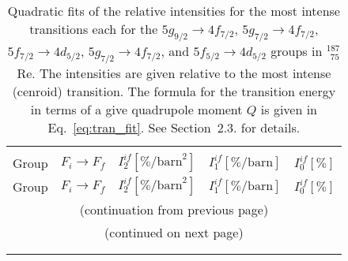 %
\begin{longtable}{cc|rrr}
\caption{\label{tab:re187intens}%
Quadratic fits of the relative intensities for the most intense transitions each for the $5g_{9/2}\rightarrow4f_{7/2}$, $5g_{7/2}\rightarrow4f_{7/2}$, $5f_{7/2}\rightarrow4d_{5/2}$, $5g_{7/2}\rightarrow4f_{7/2}$, and $5f_{5/2}\rightarrow4d_{5/2}$ groups in $^{187}_{\;\,75}$Re. The intensities are given relative to the most intense (cenroid) transition. The formula for the transition energy in terms of a give quadrupole moment $Q$ is given in Eq.~\eqref{eq:tran_fit}. See Section~2.3. for details.}
\\\hline\\[-10pt]\hline\\[-10pt]
\centering
Group& $F_i \rightarrow F_f$ & $I_2^{if} [\%\text{/barn}^2]$ & $I_1^{if} [\%\text{/barn}]$ & $I_0^{if} [\%]$\\[1pt]\hline
\endfirsthead

Group& $F_i \rightarrow F_f$ & $I_2^{if} [\%\text{/barn}^2]$ & $I_1^{if} [\%\text{/barn}]$ & $I_0^{if} [\%]$\\[1pt]\hline
\multicolumn{5}{c}{{(continuation from previous page)}}\\
\endhead

\multicolumn{5}{c}{{(continued on next page)}}\\ \endfoot
\hline \\[-10pt] \hline
\endlastfoot


\end{longtable}
